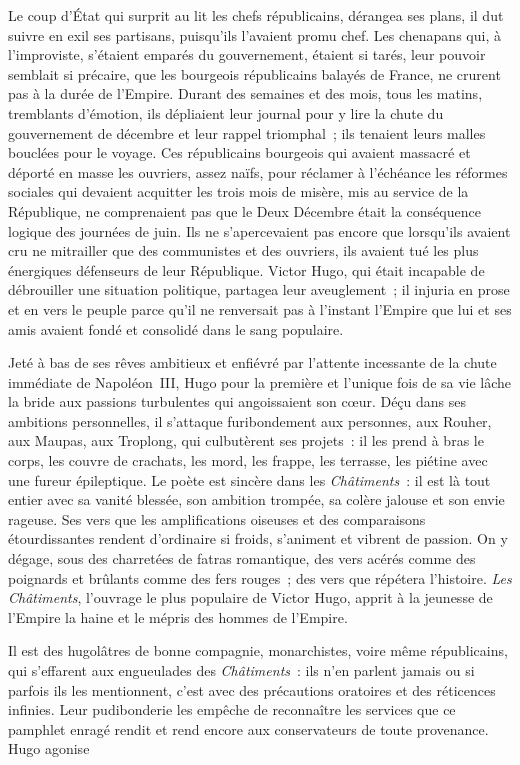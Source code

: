 \documentclass[french,twoside]{book} %
\begin{document}
Le coup d’État qui surprit au lit les chefs républicains, dérangea ses plans, il dut suivre en exil ses partisans, puisqu’ils l’avaient promu chef. Les chenapans qui, à l’improviste, s’étaient emparés du gouvernement, étaient si tarés, leur pouvoir semblait si précaire, que les bourgeois républicains balayés de France, ne crurent pas à la durée de l’Empire. Durant des semaines et des mois, tous les matins, tremblants d’émotion, ils dépliaient leur journal pour y lire la chute du gouvernement de décembre et leur rappel triomphal ; ils tenaient leurs malles bouclées pour le voyage. Ces républicains bourgeois qui avaient massacré et déporté en masse les ouvriers, assez naïfs, pour réclamer à l’échéance les réformes sociales qui devaient acquitter les trois mois de misère, mis au service de la République, ne comprenaient pas que le Deux Décembre était la conséquence logique des journées de juin. Ils ne s’apercevaient pas encore que lorsqu’ils avaient cru ne mitrailler que des communistes et des ouvriers, ils avaient tué les plus énergiques défenseurs de leur République. Victor Hugo, qui était incapable de débrouiller une situation politique, partagea leur aveuglement ; il injuria en prose et en vers le peuple parce qu’il ne renversait pas à l’instant l’Empire  
\label{p34}que lui et ses amis avaient fondé et consolidé dans le sang populaire.\par
Jeté à bas de ses rêves ambitieux et enfiévré par l’attente incessante de la chute immédiate de Napoléon III, Hugo pour la première et l’unique fois de sa vie lâche la bride aux passions turbulentes qui angoissaient son cœur. Déçu dans ses ambitions personnelles, il s’attaque furibondement aux personnes, aux Rouher, aux Maupas, aux Troplong, qui culbutèrent ses projets : il les prend à bras le corps, les couvre de crachats, les mord, les frappe, les terrasse, les piétine avec une fureur épileptique. Le poète est sincère dans les \emph{Châtiments} : il est là tout entier avec sa vanité blessée, son ambition trompée, sa colère jalouse et son envie rageuse. Ses vers que les amplifications oiseuses et des comparaisons étourdissantes rendent d’ordinaire si froids, s’animent et vibrent de passion. On y dégage, sous des charretées de fatras romantique, des vers acérés comme des poignards et brûlants comme des fers rouges ; des vers que répétera l’histoire. \emph{Les Châtiments}, l’ouvrage le plus populaire de Victor Hugo, apprit à la jeunesse de l’Empire la haine et le mépris des hommes de l’Empire.\par
Il est des hugolâtres de bonne compagnie, monarchistes, voire même républicains, qui s’effarent aux engueulades des \emph{Châtiments} : ils n’en parlent jamais ou si parfois ils les mentionnent, c’est avec des précautions oratoires et des réticences infinies. Leur pudibonderie les empêche de reconnaître les services que ce pamphlet enragé rendit et rend encore aux conservateurs de toute provenance. Hugo agonise  
\end{document}
